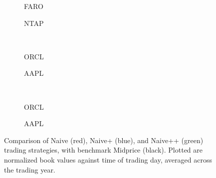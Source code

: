 \begin{figure}
\centering
\begin{subfigure}{.35\linewidth}
  \centering
  \setlength\figureheight{\linewidth} 
  \setlength\figurewidth{\linewidth}
  
  \caption{FARO}
\end{subfigure}%
\hfil%
\begin{subfigure}{.35\linewidth}
  \centering
  \setlength\figureheight{\linewidth}
  \setlength\figurewidth{\linewidth}
   
  \caption{NTAP}
\end{subfigure}\\
\vspace{1cm}
\begin{subfigure}{.35\linewidth}
  \centering
  \setlength\figureheight{\linewidth} 
  \setlength\figurewidth{\linewidth}
  
  \caption{ORCL}
\end{subfigure}%
\hfil%
\begin{subfigure}{.35\linewidth}
  \centering
  \setlength\figureheight{\linewidth}
  \setlength\figurewidth{\linewidth}
   
  \caption{AAPL}
\end{subfigure}\\
\vspace{1cm}
\begin{subfigure}{.35\linewidth}
  \centering
  \setlength\figureheight{\linewidth} 
  \setlength\figurewidth{\linewidth}
  
  \caption{ORCL}
\end{subfigure}%
\hfil%
\begin{subfigure}{.35\linewidth}
  \centering
  \setlength\figureheight{\linewidth}
  \setlength\figurewidth{\linewidth}
   
  \caption{AAPL}
\end{subfigure}%
  \caption{Comparison of Naive (red), Naive+ (blue), and Naive++ (green) trading strategies, with benchmark Midprice (black). Plotted are normalized book values against time of trading day, averaged across the trading year.}
  \label{fig:comp_cts_dscr_delta}
\end{figure}